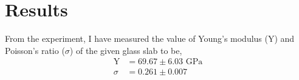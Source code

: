 \section{Results}
From the experiment, I have measured the value of Young's modulus (Y) and Poisson's ratio ($\sigma$) of the given glass slab to be,
\begin{align*}
    \text{Y} &= 69.67 \pm 6.03 \text{ GPa} \\
    \sigma   &= 0.261 \pm 0.007
\end{align*}\\[0.5pt]


